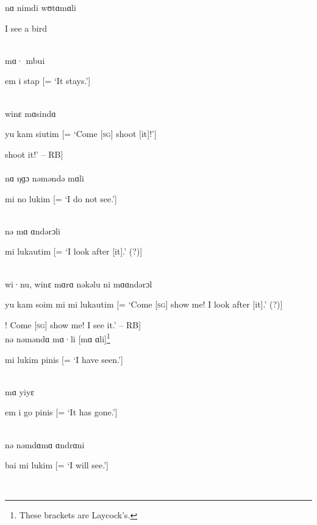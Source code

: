 \noindent nɑ nimdi wʊtɑmɑli

\noindent I see a bird

\\

\noindent mɑ· mbui

\noindent em i stap [= ‘It stays.’]

\noindent [‘It is here.’ -- RB]\\

\noindent winɛ mɑsindɑ

\noindent yu kam siutim [= ‘Come [\textsc{sg}] shoot [it]!’]

\noindent [‘Come [\textsc{sg}] shoot it!’ -- RB]\\

\\

\noindent nɑ ŋɡɔ nəməndə mɑli

\noindent mi no lukim [= ‘I do not see.’]

\\

\noindent nə mɑ ɑndərɔli

\noindent mi lukautim [= ‘I look after [it].’ (?)]

\noindent [‘I see it.’ -- RB]\\

\noindent wi·nu, winɛ mɑrɑ nəkəlu ni mɑɑndərɔl

\noindent yu kam soim mi mi lukautim [= ‘Come [\textsc{sg}] show me! I look after [it].’ (?)]

\noindent [‘Come [\textsc{sg}]! Come [\textsc{sg}] show me! I see it.’ -- RB]\\

\noindent nə nəməndɑ mɑ·li [mɑ ɑli]\footnote{These brackets are Laycock’s.}

\noindent mi lukim pinis [= ‘I have seen.’]

\noindent [‘I see it.’ -- RB]\\

\noindent mɑ yiyɛ

\noindent em i go pinis [= ‘It has gone.’]

\\

\noindent nə nəmdɑmɑ ɑndrɑni

\noindent bai mi lukim [= ‘I will see.’]

\\

